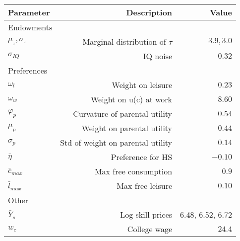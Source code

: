 \begin{tabular}{lrr}
\hline
Parameter & Description  & Value  \\ 
\hline
Endowments &   &   \\ 
$\mu_{\tau}, \sigma_{\tau}$ & Marginal distribution of $\tau$  & $3.9, 3.0$  \\ 
$\sigma_{IQ}$ & IQ noise  & $0.32$  \\ 
Preferences &   &   \\ 
$\omega_{l}$ & Weight on leisure  & $0.23$  \\ 
$\omega_{w}$ & Weight on u(c) at work  & $8.60$  \\ 
$\varphi_{p}$ & Curvature of parental utility  & $0.54$  \\ 
$\mu_{p}$ & Weight on parental utility  & $0.44$  \\ 
$\sigma_{p}$ & Std of weight on parental utility  & $0.14$  \\ 
$\bar{\eta}$ & Preference for HS  & $-0.10$  \\ 
$\bar{c}_{max}$ & Max free consumption  & $0.9$  \\ 
$\bar{l}_{max}$ & Max free leisure  & $0.10$  \\ 
Other &   &   \\ 
$\bar{Y}_{s}$ & Log skill prices  & 6.48, 6.52, 6.72  \\ 
$w_{c}$ & College wage  & $24.4$  \\ 
\hline
\end{tabular}%
